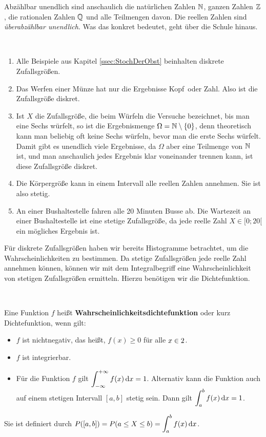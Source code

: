 \documentclass[ngerman, 12pt]{nssheetxea}
\begin{document}
Abzählbar unendlich sind anschaulich die natürlichen Zahlen $\mathbb{N}$, ganzen Zahlen $\mathbb{Z}$, die rationalen Zahlen $\mathbb{Q}$ und alle Teilmengen davon. Die reellen Zahlen sind \textit{überabzählbar unendlich}. Was das konkret bedeutet, geht über die Schule hinaus.

\begin{example} \ 
\begin{enumerate}
\item Alle Beispiele aus Kapitel \ref{ssec:StochDerObst} beinhalten diskrete Zufallsgrößen.
\item Das Werfen einer Münze hat nur die Ergebnisse \glqq Kopf\grqq \ oder \glqq Zahl\grqq . Also ist die Zufallsgröße diskret.
\item Ist $X$ die Zufallsgröße, die beim Würfeln die Versuche bezeichnet, bis man eine Sechs würfelt, so ist die Ergebnismenge $\Omega = \mathbb{N} \setminus \{ 0 \}$, denn theoretisch kann man beliebig oft keine Sechs würfeln, bevor man die erste Sechs würfelt. Damit gibt es unendlich viele Ergebnisse, da $\Omega$ aber eine Teilmenge von $\mathbb{N}$ ist, und man anschaulich jedes Ergebnis klar voneinander trennen kann, ist diese Zufallsgröße diskret.
\item Die Körpergröße kann in einem Intervall alle reellen Zahlen annehmen. Sie ist also stetig.
\item An einer Bushaltestelle fahren alle 20 Minuten Busse ab. Die Wartezeit an einer Bushaltestelle ist eine stetige Zufallsgröße, da jede reelle Zahl $X\in [0;20[$ ein mögliches Ergebnis ist.
\end{enumerate}
\end{example}

Für diskrete Zufallsgrößen haben wir bereits Histogramme betrachtet, um die Wahrscheinlichkeiten zu bestimmen. Da stetige Zufallsgrößen jede reelle Zahl annehmen können, können wir mit dem Integralbegriff eine Wahrscheinlichkeit von stetigen Zufallsgrößen ermitteln. Hierzu benötigen wir die Dichtefunktion.

\begin{definition} \ 
\item Eine Funktion $f$ heißt \textbf{Wahrscheinlichkeitsdichtefunktion} oder kurz Dichtefunktion, wenn gilt:
\begin{itemize}
\item $f$ ist nichtnegativ, das heißt, $f(x)\geq 0$ für alle $x\in 2$.
\item $f$ ist integrierbar.
\item Für die Funktion $f$ gilt $\displaystyle \int_{-\infty}^{+\infty}f(x) \mathop{}\!\mathrm{d} x = 1$. Alternativ kann die Funktion auch auf einem stetigen Intervall $[a,b]$ stetig sein. Dann gilt $\displaystyle \int_a^b f(x) \mathop{}\!\mathrm{d} x = 1$.
\end{itemize}
Sie ist definiert durch $\displaystyle P([a,b])=P(a\leq X \leq b)=\int_a^bf(x)\mathop{}\!\mathrm{d} x$.
 
\label{Def:Dichtefunktion}
\end{definition}
\end{document}
